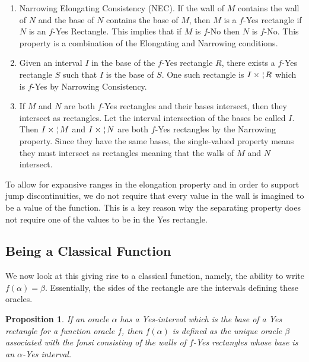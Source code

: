 \documentclass[12pt]{article}
\newtheorem{proposition}{Proposition}[subsection]
\theoremstyle{remark}
\begin{document}
\begin{enumerate}
    \item Narrowing Elongating Consistency (NEC). If the wall of $M$ contains the wall of $N$ and the base of $N$ contains the base of $M$, then $M$ is a $f$-Yes rectangle if $N$  is an $f$-Yes Rectangle. This implies that if $M$ is $f$-No then $N$ is $f$-No. This property is a combination of the Elongating and Narrowing conditions. 

    \item Given an interval $I$ in the base of the $f$-Yes rectangle $R$, there exists a $f$-Yes rectangle $S$ such that $I$ is the base of $S$. One such rectangle is $I \times \wall{R}$ which is $f$-Yes by Narrowing Consistency. 

    \item If $M$ and $N$ are both $f$-Yes rectangles and their bases intersect, then they intersect as rectangles. Let the interval intersection of the bases be called $I$. Then $I\times \wall{M}$  and $I \times \wall{N}$ are both $f$-Yes rectangles by the Narrowing property. Since they have the same bases, the single-valued property means they must intersect as rectangles meaning that the walls of $M$ and $N$ intersect. 

\end{enumerate}

To allow for expansive ranges in the elongation property and in order to support jump discontinuities, we do not require that every value in the wall is imagined to be a value of the function. This is a key reason why the separating property does not require one of the values to be in the Yes rectangle. 


\subsection{Being a Classical Function}

We now look at this giving rise to a classical function, namely, the ability to write $f(\alpha) = \beta$. Essentially, the sides of the rectangle are the intervals defining these oracles.  

\begin{proposition}
If an oracle $\alpha$ has a Yes-interval which is the base of a Yes rectangle for a function oracle $f$, then $f(\alpha)$ is defined as the unique oracle $\beta$ associated with the fonsi consisting of the walls of $f$-Yes rectangles whose base is an $\alpha$-Yes interval. 
\end{proposition}
\end{document}
